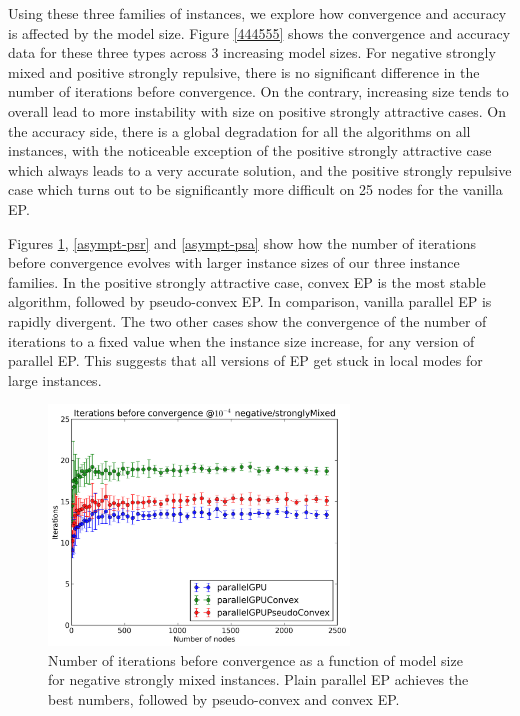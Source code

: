 \documentclass[times, 10pt,twocolumn]{article}
\begin{document}
Using these three families of instances, we explore how convergence and accuracy is affected by the model size. Figure \ref{444555} shows the convergence and accuracy data for these three types across 3 increasing model sizes. For negative strongly mixed and positive strongly repulsive, there is no significant difference in the number of iterations before convergence. On the contrary, increasing size tends to overall lead to more instability with size on positive strongly attractive cases. On the accuracy side, there is a global degradation for all the algorithms on all instances, with the noticeable exception of the positive strongly attractive case which always leads to a very accurate solution, and the positive strongly repulsive case which turns out to be significantly more difficult on 25 nodes for the vanilla EP.

Figures \ref{asympt-nsm}, \ref{asympt-psr} and \ref{asympt-psa} show how the number of iterations before convergence evolves with larger instance sizes of our three instance families. In the positive strongly attractive case, convex EP is the most stable algorithm, followed by pseudo-convex EP. In comparison, vanilla parallel EP is rapidly divergent. The two other cases show the convergence of the number of iterations to a fixed value when the instance size increase, for any version of parallel EP. This suggests that all versions of EP get stuck in local modes for large instances.

\begin{figure}[h!]\centering
	\includegraphics[width=8cm]{plots/sizes/Iterations_before_convergence_e-4_negative_stronglyMixed.png}
	\caption{Number of iterations before convergence as a function of model size for negative strongly mixed instances. Plain parallel EP achieves the best numbers, followed by pseudo-convex and convex EP.}
	\label{asympt-nsm}
\end{figure}
\end{document}
